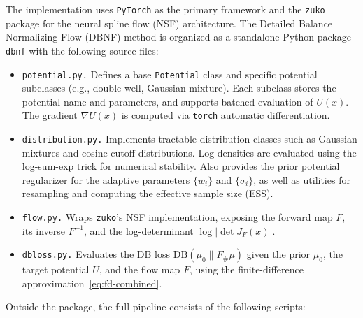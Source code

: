 \documentclass{article}
\newcommand{\DB}{\mathrm{DB}}
\theoremstyle{plain}
\begin{document}
The implementation uses \texttt{PyTorch} as the primary framework and the \texttt{zuko} package for the neural spline flow (NSF) architecture. The Detailed Balance Normalizing Flow (DBNF) method is organized as a standalone Python package \texttt{dbnf} with the following source files:
\begin{itemize}
    \item \texttt{potential.py.} Defines a base \texttt{Potential} class and specific potential subclasses (e.g., double-well, Gaussian mixture). Each subclass stores the potential name and parameters, and supports batched evaluation of $U(x)$. The gradient $\nabla U(x)$ is computed via \texttt{torch} automatic differentiation.
    \item \texttt{distribution.py.} Implements tractable distribution classes such as Gaussian mixtures and cosine cutoff distributions. Log-densities are evaluated using the log-sum-exp trick for numerical stability. Also provides the prior potential regularizer for the adaptive parameters $\{w_i\}$ and $\{\sigma_i\}$, as well as utilities for resampling and computing the effective sample size (ESS).
    \item \texttt{flow.py.} Wraps \texttt{zuko}'s NSF implementation, exposing the forward map $F$, its inverse $F^{-1}$, and the log-determinant $\log|\det J_F(x)|$.
    \item \texttt{dbloss.py.} Evaluates the DB loss $\DB(\mu_0\| F_{\#}\mu)$ given the prior $\mu_0$, the target potential $U$, and the flow map $F$, using the finite-difference approximation~\eqref{eq:fd-combined}.
\end{itemize}
Outside the package, the full pipeline consists of the following scripts:
\end{document}
